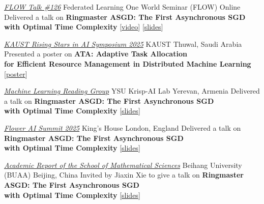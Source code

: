 \documentclass[10pt,a4paper,sans]{moderncv}        %
\newcommand{\red}{\color{cherry}}
\newcommand{\kaust}{KAUST}
\newcommand{\yerevan}{Yerevan, Armenia}
\newcommand{\thuwal}{Thuwal, Saudi Arabia}
\newcommand{\highlight}[1]{{\red #1}}
\begin{document}
    {\textcolor{accent}{\href{https://sites.google.com/view/one-world-seminar-series-flow/archive/2025?authuser=0\#h.99nho9x1b8ju}{\textit{FLOW Talk \#126}}}}
    {Federated Learning One World Seminar (FLOW)}
    {Online}{}
    {
      Delivered a talk on \textbf{Ringmaster ASGD: The First Asynchronous SGD\\
      with Optimal Time Complexity} [{\textcolor{orange}{\href{https://youtu.be/DJI1SWfG6ME?si=VJGtD1G840gO5d-w}{video}}}] [{\href{https://artomaranjyan.github.io/assets/pdf/Ringmaster_FLOW.pdf}{slides}}]
    }

    {\textcolor{accent}{\href{https://www.kaust.edu.sa/en/news/rising-stars-in-ai-symposium-2025}{\textit{KAUST Rising Stars in AI Symposium 2025}}}}
    {\kaust}
    {\thuwal}
    {}
    {
      Presented a poster on \textbf{ATA: Adaptive Task Allocation\\ 
      for Efficient Resource Management in Distributed Machine Learning} [{\href{https://artomaranjyan.github.io/assets/pdf/posters/ATA_Rising_Stars.pdf}{poster}}]
    }

    {\textcolor{accent}{\href{https://artomaranjyan.github.io/assets/pdf/YerevaNN_talk_announcment.jpg}{\textit{Machine Learning Reading Group}}}}
    {YSU Krisp-AI Lab}
    {\yerevan}
    {}
    {
      Delivered a talk on \textbf{Ringmaster ASGD: The First Asynchronous SGD\\
      with Optimal Time Complexity} [{\href{https://artomaranjyan.github.io/assets/pdf/Ringmaster_YerevaNN.pdf}{slides}}]
    }

    {\textcolor{accent}{\href{https://flower.ai/events/flower-ai-summit-2025/\#:\~:text=CTO\%20\%C2\%B7-,Ringmaster\%20ASGD\%3A\%20The\%20First\%20Asynchronous\%20SGD\%20with\%20Optimal\%20Time\%20Complexity,-Artavazd\%20Maranjyan}{\textit{Flower AI Summit 2025}}}}
    {King's House}
    {London, England}
    {}
    {
      Delivered a talk on \textbf{Ringmaster ASGD: The First Asynchronous SGD\\
      with Optimal Time Complexity} [{\href{https://artomaranjyan.github.io/assets/pdf/Ringmaster_Flower.pdf}{slides}}]
    }

    {\textcolor{accent}{\href{https://math.buaa.edu.cn/info/1296/6437.htm}{\textit{Academic Report of the School of Mathematical Sciences}}}}
    {Beihang University (BUAA)}
    {Beijing, China}
    {}
    {
      Invited by \highlight{Jiaxin Xie} to give a talk on \textbf{Ringmaster ASGD: The First Asynchronous SGD\\
      with Optimal Time Complexity} [{\href{https://artomaranjyan.github.io/assets/pdf/Ringmaster_BUAA.pdf}{slides}}]
    }
\end{document}
